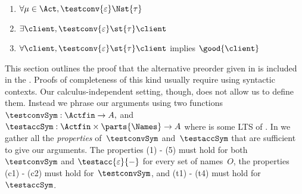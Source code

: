 \begin{table*}
  \\[2em]
      \begin{minipage}{300pt}
      \begin{enumerate}[(c1)]
      \item
        $\forall \mu \in \Act, \testconv{\varepsilon} \Nst{\tau}$ \qquad
      \item
        $\exists \client, \testconv{\varepsilon} \st{\tau} \client$ \qquad
      \item
        $\forall \client, \testconv{\varepsilon} \st{\tau} \client$ implies
        $\good{ \client }$
        \\
      \end{enumerate}
      \end{minipage}
  \caption{Properties of the functions that generate clients.}
\hrulefill
\label{tab:properties-functions-to-generate-clients}
\end{table*}


\label{sec:bhv-completeness}
This section outlines the proof that the alternative preorder
given in  is included in the \mustpreorder.
Proofs of completeness of this kind usually require using syntactic
contexts. Our calculus-independent setting, though, does not allow us to
define them.  Instead we phrase our arguments using two functions
$
\testconvSym :  \Actfin \rightarrow \States,$ and
$\testaccSym :  \Actfin \times \parts{\Names} \rightarrow \States$
where  is some LTS of \obaFB.
In  we gather all the
{\em properties} of~$\testconvSym$ and~$\testaccSym$ that are sufficient to give our
arguments. The properties (1) - (5) must hold for both~$\testconvSym$ and
$\testacc{\varepsilon}{-}$ for every set of names~$O$, the properties (c1) -
(c2) must hold for~$\testconvSym$, and (t1) - (t4) must hold for~$\testaccSym$.

